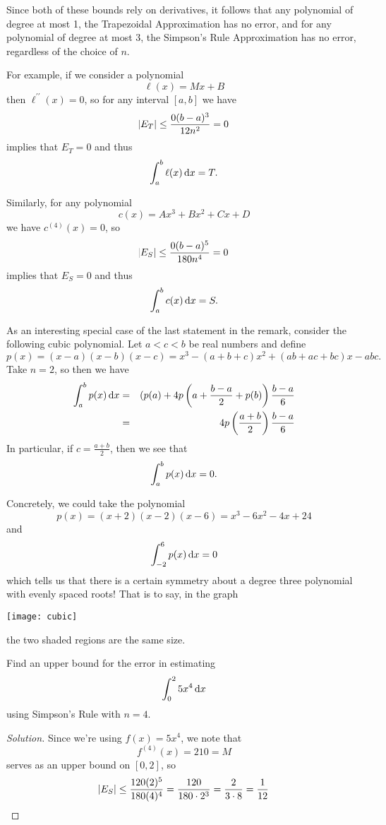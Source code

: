 \documentclass[reqno, 12pt]{amsart}
\begin{document}
\begin{remark}
  Since both of these bounds rely on derivatives, it follows that any polynomial of degree at most 1, the Trapezoidal Approximation has no error, and for any polynomial of degree at most 3, the Simpson's Rule Approximation has no error, regardless of the choice of \(n\).

  For example, if we consider a polynomial
  \[\ell(x) = Mx + B\]
  then \(\ell^{\prime\prime}(x) = 0\), so for any interval \([a,b]\) we have
  \[\abs{E_T} \leq \frac{0(b-a)^3}{12n^2} = 0\]
  implies that \(E_T = 0\) and thus
  \[\int_a^b \ell(x)\dif x = T.\]

  Similarly, for any polynomial
  \[c(x) = Ax^3 + Bx^2 + Cx + D\]
  we have \(c^{(4)}(x) = 0\), so
  \[\abs{E_S} \leq \frac{0(b-a)^5}{180n^4} = 0\]
  implies that \(E_S = 0\) and thus
  \[\int_a^b c(x)\dif x = S.\]
\end{remark}

\begin{example}
  As an interesting special case of the last statement in the remark, consider the following cubic polynomial.
  Let \(a < c < b\) be real numbers and define
  \[p(x) = (x -a)(x-b)(x - c) = x^3 - (a + b + c)x^2 +  (ab + ac + bc)x  - abc.\]
  Take \(n = 2\), so then we have
  \begin{eqnarray*}
    \int_a^b p(x)\dif x &=& (p(a) + 4p\left(a + \frac{b-a}{2} + p(b)\right)\frac{b-a}{6}\\
    &=& 4p\left(\frac{a + b}{2}\right)\frac{b - a}{6}
  \end{eqnarray*}
  In particular, if \(c = \frac{a + b}{2}\), then we see that
  \[\int_a^b p(x)\dif x = 0.\]

  Concretely, we could take the polynomial
  \[p(x) = (x + 2)(x - 2)(x - 6) = x^3 - 6x^2 - 4x + 24\]
  and
  \[\int_{-2}^6 p(x)\dif x = 0\]
  which tells us that there is a certain symmetry about a degree three polynomial with evenly spaced roots!
  That is to say, in the graph
  \begin{center}
    \texttt{[image: cubic]}
  \end{center}
  the two shaded regions are the same size.
\end{example}

\begin{example}
  Find an upper bound for the error in estimating
  \[\int_0^2 5x^4\dif x\]
  using Simpson's Rule with \(n = 4\).
\end{example}

\begin{proof}[Solution]
  Since we're using \(f(x) = 5x^4\), we note that
  \[f^{(4)}(x) = 210 = M\]
  serves as an upper bound on \([0,2]\), so
  \[\abs{E_S} \leq \frac{120(2)^5}{180(4)^4} = \frac{120}{180 \cdot 2^3} = \frac{2}{3\cdot8} = \frac{1}{12}\]
\end{proof}
\end{document}
